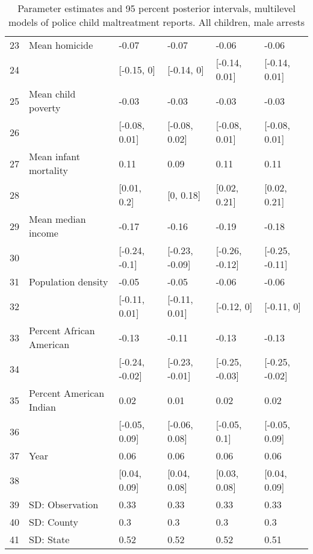 \begin{table}[ht]
\begin{tabular}{rlllll}
  23 & Mean homicide & -0.07 & -0.07 & -0.06 & -0.06 \\ 
  24 &  & [-0.15, 0] & [-0.14, 0] & [-0.14, 0.01] & [-0.14, 0.01] \\ 
  25 & Mean child poverty & -0.03 & -0.03 & -0.03 & -0.03 \\ 
  26 &  & [-0.08, 0.01] & [-0.08, 0.02] & [-0.08, 0.01] & [-0.08, 0.01] \\ 
  27 & Mean infant mortality & 0.11 & 0.09 & 0.11 & 0.11 \\ 
  28 &  & [0.01, 0.2] & [0, 0.18] & [0.02, 0.21] & [0.02, 0.21] \\ 
  29 & Mean median income & -0.17 & -0.16 & -0.19 & -0.18 \\ 
  30 &  & [-0.24, -0.1] & [-0.23, -0.09] & [-0.26, -0.12] & [-0.25, -0.11] \\ 
  31 & Population density & -0.05 & -0.05 & -0.06 & -0.06 \\ 
  32 &  & [-0.11, 0.01] & [-0.11, 0.01] & [-0.12, 0] & [-0.11, 0] \\ 
  33 & Percent African American & -0.13 & -0.11 & -0.13 & -0.13 \\ 
  34 &  & [-0.24, -0.02] & [-0.23, -0.01] & [-0.25, -0.03] & [-0.25, -0.02] \\ 
  35 & Percent American Indian & 0.02 & 0.01 & 0.02 & 0.02 \\ 
  36 &  & [-0.05, 0.09] & [-0.06, 0.08] & [-0.05, 0.1] & [-0.05, 0.09] \\ 
  37 & Year & 0.06 & 0.06 & 0.06 & 0.06 \\ 
  38 &  & [0.04, 0.09] & [0.04, 0.08] & [0.03, 0.08] & [0.04, 0.09] \\ 
  39 & SD: Observation & 0.33 & 0.33 & 0.33 & 0.33 \\ 
  40 & SD: County & 0.3 & 0.3 & 0.3 & 0.3 \\ 
  41 & SD: State & 0.52 & 0.52 & 0.52 & 0.51 \\ 
   \hline
\end{tabular}
\caption{Parameter estimates and 95 percent posterior intervals, multilevel models of 
             police child maltreatment reports. All children, male arrests} 
\end{table}
